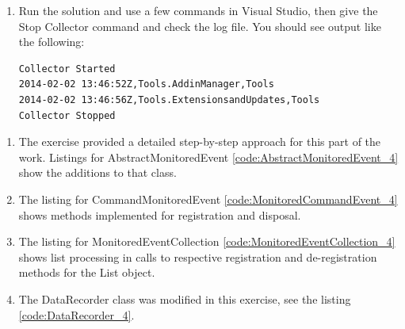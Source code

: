 \begin{Exercise}
\begin{enumerate}
\item
Run the solution and use a few commands in Visual Studio, then give the Stop Collector command and check the log file.  You should see output like the following:
\begin{verbatim}
Collector Started
2014-02-02 13:46:52Z,Tools.AddinManager,Tools
2014-02-02 13:46:56Z,Tools.ExtensionsandUpdates,Tools
Collector Stopped
\end{verbatim}
\end{enumerate}
\end{Exercise}

\begin{Answer}
\begin{enumerate}
\item
The exercise provided a detailed step-by-step approach for this part of the work.  Listings for AbstractMonitoredEvent \ref{code:AbstractMonitoredEvent_4}  show the additions to that class.  
%

\item
The listing for CommandMonitoredEvent \ref{code:MonitoredCommandEvent_4} shows methods implemented for registration and disposal.
%

\item
The listing for MonitoredEventCollection \ref{code:MonitoredEventCollection_4} shows list processing in calls to respective registration and de-registration methods for the List object.
%

\item
The DataRecorder class was modified in this exercise, see the listing \ref{code:DataRecorder_4}.
%
\end{enumerate}
\end{Answer}

